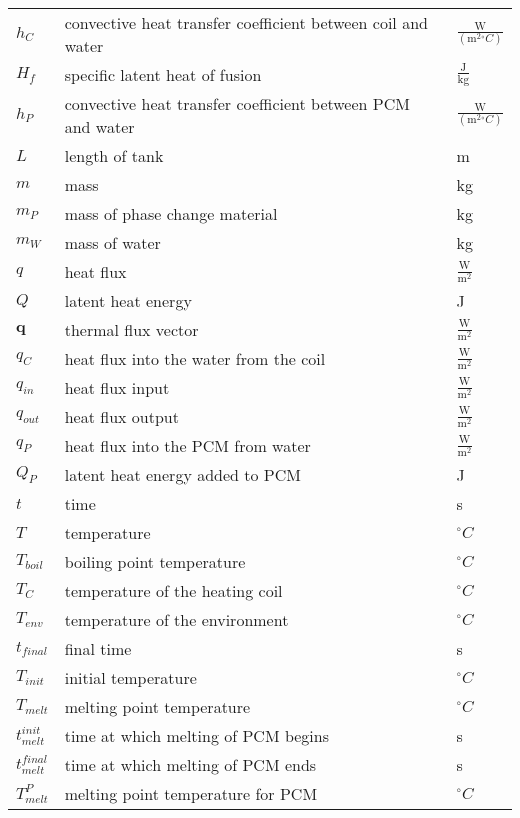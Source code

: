 \documentclass[12pt]{article}
\begin{document}
\begin{longtable*}{l l l}
\\
$h_{C}$ & convective heat transfer coefficient between coil and water & $\frac{\text{W}}{(\text{m}^{2}{}^{\circ}C)}$
\\
$H_{f}$ & specific latent heat of fusion & $\frac{\text{J}}{\text{kg}}$
\\
$h_{P}$ & convective heat transfer coefficient between PCM and water & $\frac{\text{W}}{(\text{m}^{2}{}^{\circ}C)}$
\\
$L$ & length of tank & m
\\
$m$ & mass & kg
\\
$m_{P}$ & mass of phase change material & kg
\\
$m_{W}$ & mass of water & kg
\\
$q$ & heat flux & $\frac{\text{W}}{\text{m}^{2}}$
\\
$Q$ & latent heat energy & J
\\
$\mathbf{q}$ & thermal flux vector & $\frac{\text{W}}{\text{m}^{2}}$
\\
$q_{C}$ & heat flux into the water from the coil & $\frac{\text{W}}{\text{m}^{2}}$
\\
$q_{in}$ & heat flux input & $\frac{\text{W}}{\text{m}^{2}}$
\\
$q_{out}$ & heat flux output & $\frac{\text{W}}{\text{m}^{2}}$
\\
$q_{P}$ & heat flux into the PCM from water & $\frac{\text{W}}{\text{m}^{2}}$
\\
$Q_{P}$ & latent heat energy added to PCM & J
\\
$t$ & time & s
\\
$T$ & temperature & ${}^{\circ}C$
\\
$T_{boil}$ & boiling point temperature & ${}^{\circ}C$
\\
$T_{C}$ & temperature of the heating coil & ${}^{\circ}C$
\\
$T_{env}$ & temperature of the environment & ${}^{\circ}C$
\\
$t_{final}$ & final time & s
\\
$T_{init}$ & initial temperature & ${}^{\circ}C$
\\
$T_{melt}$ & melting point temperature & ${}^{\circ}C$
\\
$t_{melt}^{init}$ & time at which melting of PCM begins & s
\\
$t_{melt}^{final}$ & time at which melting of PCM ends & s
\\
$T_{melt}^{P}$ & melting point temperature for PCM & ${}^{\circ}C$
\\

\end{longtable*}
\end{document}
